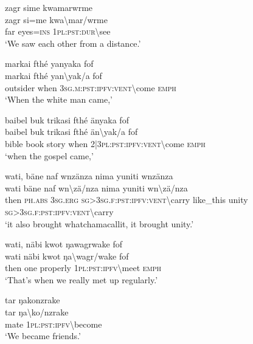 \ea\label{ex:2:a1725}
zagr sime kwamarwrme\\
\gll zagr	si=me	kwa{\textbackslash}mar/wrme\\
     far	eyes=\textsc{ins}	1\textsc{pl}:\textsc{pst}:\textsc{dur}{\textbackslash}see\\
\glt `We saw each other from a distance.'
\z

\ea\label{ex:2:a1726}
markai fthé yanyaka fof\\
\gll markai	fthé	yan{\textbackslash}yak/a	fof\\
     outsider	when	3\textsc{sg}.\textsc{m}:\textsc{pst}:\textsc{ipfv}:\textsc{vent}{\textbackslash}come	\textsc{emph}\\
\glt `When the white man came,'
\z

\ea\label{ex:2:a1727}
baibel buk trikasi fthé änyaka fof\\
\gll baibel	buk	trikasi	fthé	än{\textbackslash}yak/a	fof\\
     bible	book	story	when	2|3\textsc{pl}:\textsc{pst}:\textsc{ipfv}:\textsc{vent}{\textbackslash}come	\textsc{emph}\\
\glt `when the gospel came,'
\z

\ea\label{ex:2:a1728}
wati, bäne naf wnzänza nima yuniti wnzänza\\
\gll wati	bäne	naf	wn{\textbackslash}zä/nza	nima	yuniti	wn{\textbackslash}zä/nza\\
     then	\textsc{ph}.\textsc{abs}	3\textsc{sg}.\textsc{erg}	\textsc{sg}>3\textsc{sg}.\textsc{f}:\textsc{pst}:\textsc{ipfv}:\textsc{vent}{\textbackslash}carry	like\_this	unity	\textsc{sg}>3\textsc{sg}.\textsc{f}:\textsc{pst}:\textsc{ipfv}:\textsc{vent}{\textbackslash}carry\\
\glt `it also brought whatchamacallit, it brought unity.'
\z

\ea\label{ex:2:a1729}
wati, näbi kwot ŋawagrwake fof\\
\gll wati	näbi	kwot	ŋa{\textbackslash}wagr/wake	fof\\
     then	one	properly	1\textsc{pl}:\textsc{pst}:\textsc{ipfv}{\textbackslash}meet	\textsc{emph}\\
\glt `That's when we really met up regularly.'
\z

\ea\label{ex:2:a1731}
tar ŋakonzrake\\
\gll tar	ŋa{\textbackslash}ko/nzrake\\
     mate	1\textsc{pl}:\textsc{pst}:\textsc{ipfv}{\textbackslash}become\\
\glt `We became friends.'
\z

